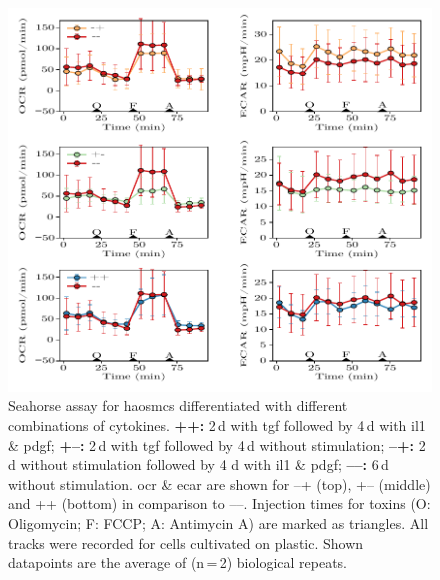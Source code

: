     \begin{figure}[h!]
    \capstart
        \centering
        \includegraphics{Abbildung/Seahorse_tracks.pdf}

        \begin{minipage}{\captionwidth}
            \caption[seahorse_tracks]{ \newline Seahorse assay for \acp{haosmc} differentiated with different combinations of cytokines.
            \textbf{++:} 2\,d with \ac{tgf} followed by 4\,d with \ac{il1} \& \ac{pdgf};
            \textbf{+–:} 2\,d with \ac{tgf} followed by 4\,d without stimulation;
            \textbf{–+:} 2\,d without stimulation followed by 4 d with \ac{il1} \& \ac{pdgf};
            \textbf{––:} 6\,d without stimulation.
            \ac{ocr} \& \ac{ecar} are shown for –+ (top), +– (middle) and ++ (bottom) in comparison to ––. Injection times for toxins (O: Oligomycin; F: FCCP; A: Antimycin A) are marked as triangles. All tracks were recorded for cells cultivated on plastic. Shown datapoints are the average of (n\,=\,2) biological repeats.
            }
            \label{fig:seahorse_tracks}
        \end{minipage}
    \end{figure}


